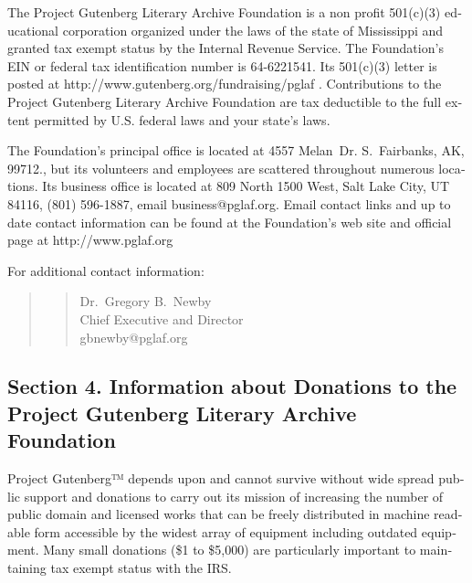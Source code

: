 \documentclass[a5paper]{book}
\begin{document}
\begin{german}
\begin{english}
\begin{pgfooter_env}
The Project Gutenberg Literary Archive Foundation is a non profit
501(c)(3) educational corporation organized under the laws of the
state of Mississippi and granted tax exempt status by the Internal
Revenue Service. The Foundation’s EIN or federal tax identification
number is 64-6221541. Its 501(c)(3) letter is posted at
{http://www.gutenberg.org/fundraising/pglaf} . Contributions to the
Project Gutenberg Literary Archive Foundation are tax deductible to
the full extent permitted by U.S.  federal laws and your state’s laws.\par

The Foundation’s principal office is located at 4557 Melan Dr.
S. Fairbanks, AK, 99712., but its volunteers and employees are
scattered throughout numerous locations. Its business office is
located at 809 North 1500 West, Salt Lake City, UT 84116, (801)
596-1887, email {business@pglaf.org}. Email contact links and up to date
contact information can be found at the Foundation’s web site and
official page at {http://www.pglaf.org}\par

For additional contact information:\par

\begin{quotation}
\begin{verse}
Dr. Gregory B. Newby \\
Chief Executive and Director \\
{gbnewby@pglaf.org} \\
\end{verse}
\end{quotation}

%
\label{section-4-information-about-donations-to-the-project-gutenberg-literary-archive-foundation}%
\hypertarget{section-4-information-about-donations-to-the-project-gutenberg-literary-archive-foundation}{}%
%
\subsection*{Section 4. Information about Donations to the Project Gutenberg Literary Archive Foundation}


Project Gutenberg™ depends upon and cannot survive without wide spread
public support and donations to carry out its mission of increasing
the number of public domain and licensed works that can be freely
distributed in machine readable form accessible by the widest array of
equipment including outdated equipment. Many small donations (\$1 to
\$5,000) are particularly important to maintaining tax exempt status
with the IRS.\par


\end{pgfooter_env}
\end{english}
\end{german}
\end{document}
